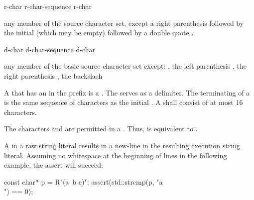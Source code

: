 \documentclass{wg21}
\newcommand{\clb}[1]{\removed{#1} \added{\grammarterm{line-break}}}
\begin{document}
\begin{bnf}
    \br
      \terminal{(}  \terminal{)}  
\end{bnf}

\begin{bnf}
    \br
    r-char\br
    r-char-sequence r-char
\end{bnf}

\begin{bnf}
    \br
    \textnormal{any member of the source character set, except a right parenthesis \terminal{)} followed by}\br
    \bnfindent\textnormal{the initial  (which may be empty) followed by a double quote .}
\end{bnf}

\begin{bnf}
    \br
    d-char\br
    d-char-sequence d-char
\end{bnf}

\begin{bnf}
\br
\textnormal{any member of the basic source character set except:}\br
{}, \textnormal{the left parenthesis \terminal{(}, the right parenthesis \terminal{)}, the backslash \terminal{\textbackslash}}
\end{bnf}

\pnum
{}%
A  that has an 
%
in the prefix is a . The
 serves as a delimiter. The terminating
 of a  is the same sequence of
characters as the initial . A 
shall consist of at most 16 characters.

\pnum
\begin{note}
    The characters  and  are permitted in a
    . Thus,  is equivalent to
    .
\end{note}

\pnum
\removed{[\textit{Note:}}\space A \clb{source-file new-line} in a raw string literal results in a new-line in the
    resulting execution string literal. Assuming no
    whitespace at the beginning of lines in the following example, the assert will succeed:
    \begin{codeblock}
        const char* p = R"(a\
        b
        c)";
        assert(std::strcmp(p, "a\\\nb\nc") == 0);
    \end{codeblock}
\removed{\textit{--- end note}]}
\end{document}
